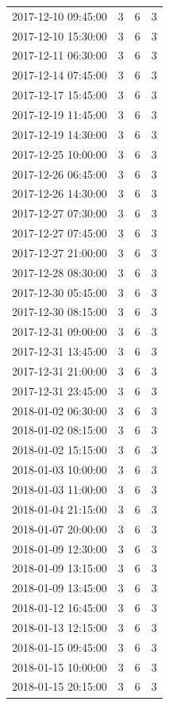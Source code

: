 \begin{tabular}{lrrr}
2017-12-10 09:45:00 & 3 & 6 & 3 \\
2017-12-10 15:30:00 & 3 & 6 & 3 \\
2017-12-11 06:30:00 & 3 & 6 & 3 \\
2017-12-14 07:45:00 & 3 & 6 & 3 \\
2017-12-17 15:45:00 & 3 & 6 & 3 \\
2017-12-19 11:45:00 & 3 & 6 & 3 \\
2017-12-19 14:30:00 & 3 & 6 & 3 \\
2017-12-25 10:00:00 & 3 & 6 & 3 \\
2017-12-26 06:45:00 & 3 & 6 & 3 \\
2017-12-26 14:30:00 & 3 & 6 & 3 \\
2017-12-27 07:30:00 & 3 & 6 & 3 \\
2017-12-27 07:45:00 & 3 & 6 & 3 \\
2017-12-27 21:00:00 & 3 & 6 & 3 \\
2017-12-28 08:30:00 & 3 & 6 & 3 \\
2017-12-30 05:45:00 & 3 & 6 & 3 \\
2017-12-30 08:15:00 & 3 & 6 & 3 \\
2017-12-31 09:00:00 & 3 & 6 & 3 \\
2017-12-31 13:45:00 & 3 & 6 & 3 \\
2017-12-31 21:00:00 & 3 & 6 & 3 \\
2017-12-31 23:45:00 & 3 & 6 & 3 \\
2018-01-02 06:30:00 & 3 & 6 & 3 \\
2018-01-02 08:15:00 & 3 & 6 & 3 \\
2018-01-02 15:15:00 & 3 & 6 & 3 \\
2018-01-03 10:00:00 & 3 & 6 & 3 \\
2018-01-03 11:00:00 & 3 & 6 & 3 \\
2018-01-04 21:15:00 & 3 & 6 & 3 \\
2018-01-07 20:00:00 & 3 & 6 & 3 \\
2018-01-09 12:30:00 & 3 & 6 & 3 \\
2018-01-09 13:15:00 & 3 & 6 & 3 \\
2018-01-09 13:45:00 & 3 & 6 & 3 \\
2018-01-12 16:45:00 & 3 & 6 & 3 \\
2018-01-13 12:15:00 & 3 & 6 & 3 \\
2018-01-15 09:45:00 & 3 & 6 & 3 \\
2018-01-15 10:00:00 & 3 & 6 & 3 \\
2018-01-15 20:15:00 & 3 & 6 & 3 \\

\end{tabular}
